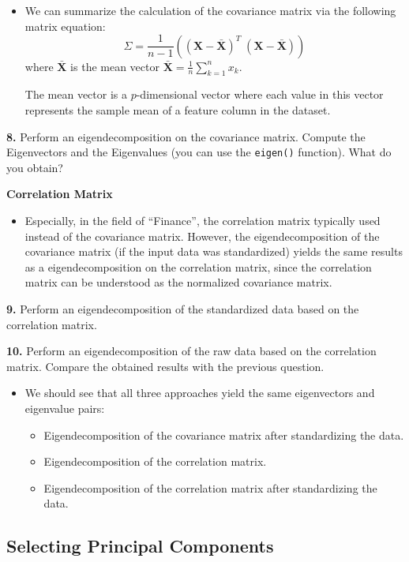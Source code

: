 \documentclass[]{book}
\providecommand{\tightlist}{%
  \setlength{\itemsep}{0pt}\setlength{\parskip}{0pt}}
\newenvironment{rmdblock}[1]
  {\begin{shaded*}
  \begin{itemize}
  \renewcommand{\labelitemi}{
    \raisebox{-.7\height}[0pt][0pt]{
      {\setkeys{Gin}{width=2em,keepaspectratio}\texttt{[image: img/icons/\#1]}}
    }
  }
  \item
  }
  {
  \end{itemize}
  \end{shaded*}
  }
\newenvironment{rmdinsight}
  {\begin{rmdblock}{insight}}
  {\end{rmdblock}}
\newenvironment{rmdtip}
  {\begin{rmdblock}{tip}}
  {\end{rmdblock}}
\begin{document}
\begin{rmdtip}
We can summarize the calculation of the covariance matrix via the
following matrix equation:
\[ \Sigma = \frac{1}{n-1} \left( (\mathbf{X} - \mathbf{\bar{X}})^T\;(\mathbf{X} - \mathbf{\bar{X}}) \right) \]
where \(\mathbf{\bar{X}}\) is the mean vector
\(\mathbf{\bar{X}} = \frac{1}{n} \sum\limits_{k=1}^n x_{k}\).

The mean vector is a \(p\)-dimensional vector where each value in this
vector represents the sample mean of a feature column in the dataset.
\end{rmdtip}

\textbf{8.} Perform an eigendecomposition on the covariance matrix.
Compute the Eigenvectors and the Eigenvalues (you can use the
\texttt{eigen()} function). What do you obtain?

\textbf{Correlation Matrix}

\begin{rmdinsight}
Especially, in the field of ``Finance'', the correlation matrix
typically used instead of the covariance matrix. However, the
eigendecomposition of the covariance matrix (if the input data was
standardized) yields the same results as a eigendecomposition on the
correlation matrix, since the correlation matrix can be understood as
the normalized covariance matrix.
\end{rmdinsight}

\textbf{9.} Perform an eigendecomposition of the standardized data based
on the correlation matrix.

\textbf{10.} Perform an eigendecomposition of the raw data based on the
correlation matrix. Compare the obtained results with the previous
question.

\begin{rmdinsight}
We should see that all three approaches yield the same eigenvectors and
eigenvalue pairs:

\begin{itemize}
\tightlist
\item
  Eigendecomposition of the covariance matrix after standardizing the
  data.
\item
  Eigendecomposition of the correlation matrix.
\item
  Eigendecomposition of the correlation matrix after standardizing the
  data.
\end{itemize}
\end{rmdinsight}

\subsection*{Selecting Principal
Components}\label{selecting-principal-components}
\end{document}
